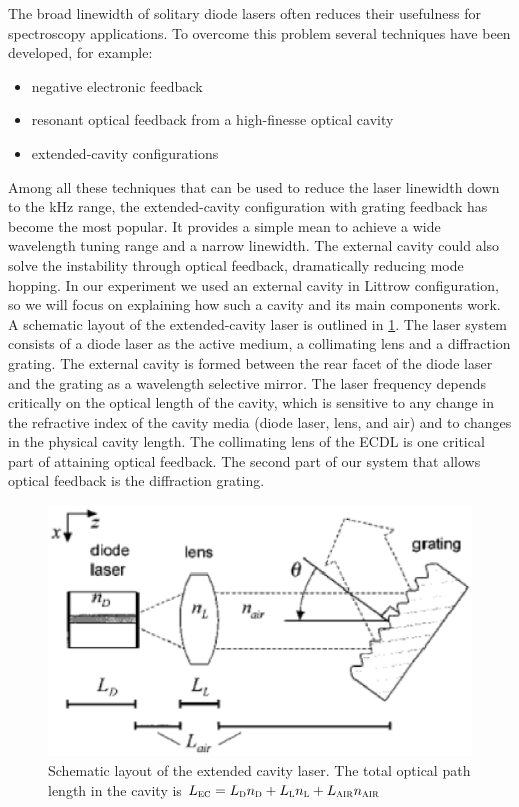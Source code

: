 The broad linewidth of solitary diode lasers often reduces their usefulness for spectroscopy applications. To overcome this problem several techniques have been developed, for example:
\begin{itemize}
\item negative electronic feedback
\item resonant optical feedback from a high-finesse optical cavity
\item extended-cavity configurations
\end{itemize}
Among all these techniques that can be used to reduce the laser linewidth down to the kHz range, the extended-cavity configuration with grating feedback has become the most popular. It provides a simple mean to achieve a wide wavelength tuning range and a narrow linewidth.
The external cavity could also solve the instability through optical feedback, dramatically reducing mode hopping.
In our experiment we used an external cavity in Littrow configuration, so we will focus on explaining how such a cavity and its main components work.
A schematic layout of the extended-cavity laser is outlined in \cref{grating}. The laser system consists of a diode laser as the active medium, a collimating lens and a diffraction grating. The external cavity is formed between the rear facet of the diode laser and the grating as a wavelength selective mirror. The laser frequency depends critically on the optical length of the cavity, which is sensitive to any change in the refractive index of the cavity media (diode laser, lens, and air) and to changes in the physical cavity length.
The collimating lens of the ECDL is one critical part of attaining optical feedback. The second part of our system that allows optical feedback is the diffraction  grating. 

\begin{figure}[!hbt]\centering
\includegraphics[width=\linewidth, draft=\foto]{eps/littrow1.eps}
\caption{Schematic layout of the extended cavity laser. The total optical path length in the cavity is $L_{\mbox{\footnotesize{\scshape{ec}}}}=L_{\mbox{\footnotesize{\scshape{d}}}}n_{\mbox{\footnotesize{\scshape{d}}}}+L_{\mbox{\footnotesize{\scshape{l}}}}n_{\mbox{\footnotesize{\scshape{l}}}}+L_{\mbox{\footnotesize{\scshape{air}}}}n_{\mbox{\footnotesize{\scshape{air}}}}$}
\label{grating}
\end{figure}

